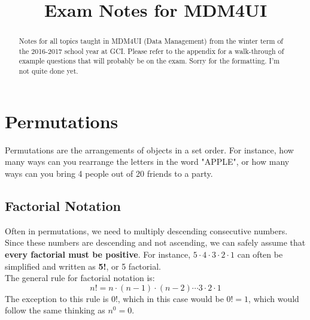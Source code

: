 \documentclass[final,1p,12pt]{elsarticle}
\begin{document}
\begin{frontmatter}
    \title{Exam Notes for MDM4UI}
    \begin{abstract}
        Notes for all topics taught in MDM4UI (Data Management) from the winter term of the 2016-2017 school year at GCI.  
        Please refer to the appendix for a walk-through of example questions that will probably be on the exam. 
        Sorry for the formatting. I'm not quite done yet.
    \end{abstract}
\end{frontmatter}

\section{Permutations}
Permutations are the arrangements of objects in a set order. 
For instance, how many ways can you rearrange the letters in the word "APPLE", 
or how many ways can you bring 4 people out of 20 friends to a party.

    \subsection{Factorial Notation}
    Often in permutations, we need to multiply descending consecutive numbers.
    Since these numbers are descending and not ascending, we can safely assume that \textbf{every factorial must be positive}. 
    For instance,  $5\cdot4\cdot3\cdot2\cdot1$ can often be simplified and written as \textbf{5!}, or 5 factorial.\\
    The general rule for factorial notation is: 
    \begin{equation*}%
        n! = n\cdot(n-1)\cdot(n-2)\cdots3\cdot2\cdot1
    \end{equation*}
    The exception to this rule is 0!, which in this case would be $0! = 1$, which would follow the same thinking as $n^0=0$.
    
\end{document}
